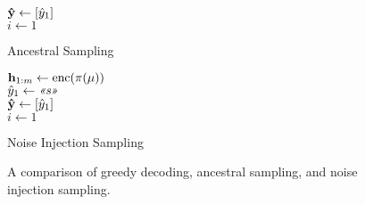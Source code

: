 \begin{figure}[t]
{\begin{minipage}{0.33\textwidth}
\begin{singlespace}
\begin{algorithm}[H]
$\boldsymbol{\hat{\mathbf{y}}} \gets \left[ \hat{{y}}_1\right]$\\
$i \gets 1$\\
\KwResult{$\predutttoks$}
\caption{\small Ancestral Sampling}
\label{alg:ancsam}
\end{algorithm}
\end{singlespace}
\end{minipage}\begin{minipage}{0.38\textwidth}
\small
\begin{singlespace}
\begin{algorithm}[H]
$\mathbf{h}_{1:m} \gets \operatorname{enc}(\pi(\mu))$\\
$\hat{{y}}_1 \gets \textit{<<s>>}$\\
$\boldsymbol{\hat{\mathbf{y}}} \gets \left[ \hat{{y}}_1\right]$\\
$i \gets 1$\\
\KwResult{$\predutttoks$}
\caption{\small Noise Injection Sampling}
\label{alg:noiseinj}
\end{algorithm}
\end{singlespace}
\end{minipage}
}
\caption{A comparison of greedy decoding, ancestral sampling, and noise injection sampling.}
\label{fig:noiseinj}


\end{figure}
